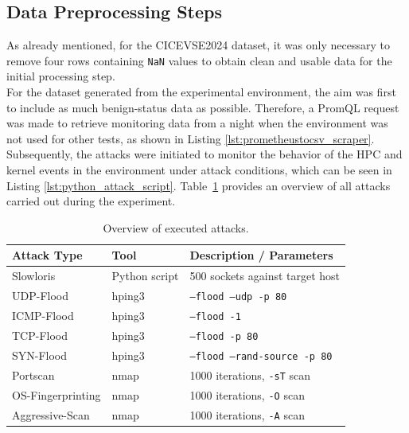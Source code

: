 \subsection{Data Preprocessing Steps}

As already mentioned, for the CICEVSE2024 dataset, it was only necessary to remove four rows containing \texttt{NaN} values to obtain clean and usable data for the initial processing step. \\

For the dataset generated from the experimental environment, the aim was first to include as much benign-status data as possible. Therefore, a PromQL request was made to retrieve monitoring data from a night when the environment was not used for other tests, as shown in Listing \ref{lst:prometheustocsv_scraper}. \\

Subsequently, the attacks were initiated to monitor the behavior of the HPC and kernel events in the environment under attack conditions, which can be seen in Listing \ref{lst:python_attack_script}.  
Table~\ref{tab:attacks} provides an overview of all attacks carried out during the experiment.

\begin{table}[H]
\centering
\begin{tabular}{|l|l|l|}
\hline
\textbf{Attack Type} & \textbf{Tool} & \textbf{Description / Parameters} \\
\hline
Slowloris          & Python script  & 500 sockets against target host \\
UDP-Flood          & hping3         & \texttt{--flood --udp -p 80} \\
ICMP-Flood         & hping3         & \texttt{--flood -1} \\
TCP-Flood          & hping3         & \texttt{--flood -p 80} \\
SYN-Flood          & hping3         & \texttt{--flood --rand-source -p 80} \\
Portscan           & nmap           & 1000 iterations, \texttt{-sT} scan \\
OS-Fingerprinting  & nmap           & 1000 iterations, \texttt{-O} scan \\
Aggressive-Scan    & nmap           & 1000 iterations, \texttt{-A} scan \\
\hline
\end{tabular}
\caption{Overview of executed attacks.}
\label{tab:attacks}
\end{table}

